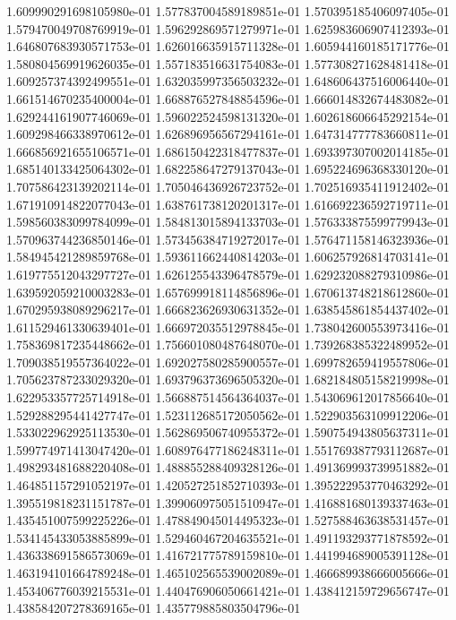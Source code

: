 1.609990291698105980e-01
1.577837004589189851e-01
1.570395185406097405e-01
1.579470049708769919e-01
1.596292869571279971e-01
1.625983606907412393e-01
1.646807683930571753e-01
1.626016635915711328e-01
1.605944160185171776e-01
1.580804569919626035e-01
1.557183516631754083e-01
1.577308271628481418e-01
1.609257374392499551e-01
1.632035997356503232e-01
1.648606437516006440e-01
1.661514670235400004e-01
1.668876527848854596e-01
1.666014832674483082e-01
1.629244161907746069e-01
1.596022524598131320e-01
1.602618606645292154e-01
1.609298466338970612e-01
1.626896956567294161e-01
1.647314777783660811e-01
1.666856921655106571e-01
1.686150422318477837e-01
1.693397307002014185e-01
1.685140133425064302e-01
1.682258647279137043e-01
1.695224696368330120e-01
1.707586423139202114e-01
1.705046436926723752e-01
1.702516935411912402e-01
1.671910914822077043e-01
1.638761738120201317e-01
1.616692236592719711e-01
1.598560383099784099e-01
1.584813015894133703e-01
1.576333875599779943e-01
1.570963744236850146e-01
1.573456384719272017e-01
1.576471158146323936e-01
1.584945421289859768e-01
1.593611662440814203e-01
1.606257926814703141e-01
1.619775512043297727e-01
1.626125543396478579e-01
1.629232088279310986e-01
1.639592059210003283e-01
1.657699918114856896e-01
1.670613748218612860e-01
1.670295938089296217e-01
1.666823626930631352e-01
1.638545861854437402e-01
1.611529461330639401e-01
1.666972035512978845e-01
1.738042600553973416e-01
1.758369817235448662e-01
1.756601080487648070e-01
1.739268385322489952e-01
1.709038519557364022e-01
1.692027580285900557e-01
1.699782659419557806e-01
1.705623787233029320e-01
1.693796373696505320e-01
1.682184805158219998e-01
1.622953357725714918e-01
1.566887514564364037e-01
1.543069612017856640e-01
1.529288295441427747e-01
1.523112685172050562e-01
1.522903563109912206e-01
1.533022962925113530e-01
1.562869506740955372e-01
1.590754943805637311e-01
1.599774971413047420e-01
1.608976477186248311e-01
1.551769387793112687e-01
1.498293481688220408e-01
1.488855288409328126e-01
1.491369993739951882e-01
1.464851157291052197e-01
1.420527251852710393e-01
1.395222953770463292e-01
1.395519818231151787e-01
1.399060975051510947e-01
1.416881680139337463e-01
1.435451007599225226e-01
1.478849045014495323e-01
1.527588463638531457e-01
1.534145433053885899e-01
1.529460467204635521e-01
1.491193293771878592e-01
1.436338691586573069e-01
1.416721775789159810e-01
1.441994689005391128e-01
1.463194101664789248e-01
1.465102565539002089e-01
1.466689938666005666e-01
1.453406776039215531e-01
1.440476906050661421e-01
1.438412159729656747e-01
1.438584207278369165e-01
1.435779885803504796e-01
